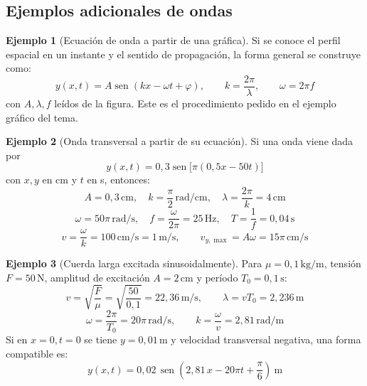 \documentclass[12pt, a4paper]{article}
\theoremstyle{plain}
\theoremstyle{definition}
\newtheorem{ejemplo}{Ejemplo}[section]
\theoremstyle{remark}
\DeclareMathOperator{\sen}{sen}
\begin{document}
\subsection{Ejemplos adicionales de ondas}

\begin{ejemplo}[Ecuación de onda a partir de una gráfica]
Si se conoce el perfil espacial en un instante y el sentido de propagación, la forma general se
construye como:
\begin{equation}
  y(x,t)=A\sen(kx-\omega t+\varphi),\qquad
  k=\frac{2\pi}{\lambda},\qquad \omega=2\pi f
\end{equation}
con $A,\lambda,f$ leídos de la figura. Este es el procedimiento pedido en el ejemplo gráfico
del tema.
\end{ejemplo}

\begin{ejemplo}[Onda transversal a partir de su ecuación]
Si una onda viene dada por
\begin{equation}
  y(x,t)=0{,}3\sen\!\bigl[\pi(0{,}5x-50t)\bigr]
\end{equation}
con $x,y$ en cm y $t$ en s, entonces:
\begin{equation}
  A=0{,}3\,\mathrm{cm},\quad
  k=\frac{\pi}{2}\,\mathrm{rad/cm},\quad
  \lambda=\frac{2\pi}{k}=4\,\mathrm{cm}
\end{equation}
\begin{equation}
  \omega=50\pi\,\mathrm{rad/s},\quad
  f=\frac{\omega}{2\pi}=25\,\mathrm{Hz},\quad
  T=\frac{1}{f}=0{,}04\,\mathrm{s}
\end{equation}
\begin{equation}
  v=\frac{\omega}{k}=100\,\mathrm{cm/s}=1\,\mathrm{m/s},\qquad
  v_{y,\max}=A\omega=15\pi\,\mathrm{cm/s}
\end{equation}
\end{ejemplo}

\begin{ejemplo}[Cuerda larga excitada sinusoidalmente]
Para $\mu=0{,}1\,\mathrm{kg/m}$, tensión $F=50\,\mathrm{N}$, amplitud de excitación
$A=2\,\mathrm{cm}$ y período $T_0=0{,}1\,\mathrm{s}$:
\begin{equation}
  v=\sqrt{\frac{F}{\mu}}=\sqrt{\frac{50}{0{,}1}}=22{,}36\,\mathrm{m/s},\qquad
  \lambda=vT_0=2{,}236\,\mathrm{m}
\end{equation}
\begin{equation}
  \omega=\frac{2\pi}{T_0}=20\pi\,\mathrm{rad/s},\qquad
  k=\frac{\omega}{v}=2{,}81\,\mathrm{rad/m}
\end{equation}
Si en $x=0,t=0$ se tiene $y=0{,}01\,\mathrm{m}$ y velocidad transversal negativa, una forma
compatible es:
\begin{equation}
  y(x,t)=0{,}02\,\sen\!\left(2{,}81\,x-20\pi t+\frac{\pi}{6}\right)\ \mathrm{m}
\end{equation}
\end{ejemplo}
\end{document}
